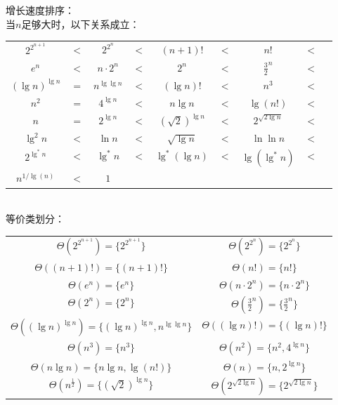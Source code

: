 
\begin{solution}
    增长速度排序：\\
    当$n$足够大时，以下关系成立：\\
    \begin{tabular}{ccccccccc}
        $2^{2^{n+1}}$       &$<$& $2^{2^n}$         &$<$& $(n+1)!$              &$<$& $n!$                  &$<$\\
        $e^n$               &$<$& $n \cdot 2^n$     &$<$& $2^n$                 &$<$& $\frac{3}{2}^{n}$     &$<$\\
        $(\lg n)^{\lg n}$   &$=$& $n^{\lg\lg n}$    &$<$& $(\lg n)!$            &$<$& $n^3$                 &$<$\\
        $n^2$               &$=$& $4^{\lg n}$       &$<$& $n\lg n$              &$<$& $\lg (n!)$            &$<$\\
        $n$                 &$=$& $2^{\lg n}$       &$<$& $(\sqrt{2})^{\lg n}$  &$<$& $2^{\sqrt{2\lg n}}$   &$<$\\
        $\lg^2 n$           &$<$& $\ln n$           &$<$& $\sqrt{\lg n}$        &$<$& $\ln\ln n$            &$<$\\
        $2^{\lg^* n}$       &$<$& $\lg^* n$         &$<$& $\lg^*(\lg n)$        &$<$& $\lg(\lg^* n)$        &$<$\\         
        $n^{1/\lg(n)}$      &$<$& $1$
    \end{tabular}\\
    等价类划分：\\
    \begin{longtable}{cc}
    $\Theta(2^{2^{n+1}}) = \{2^{2^{n+1}}\}$ &
    $\Theta(2^{2^n}) = \{2^{2^n}\}$\\
    $\Theta((n+1)!) = \{(n+1)!\}$&
    $\Theta(n!) = \{n!\}$\\
    $\Theta(e^n) = \{e^n\}$&
    $\Theta(n \cdot 2^n) = \{n \cdot 2^n\}$\\
    $\Theta(2^n) = \{2^n\}$&
    $\Theta(\frac{3}{2}^{n}) = \{\frac{3}{2}^{n}\}$\\
    $\Theta((\lg n)^{\lg n}) = \{(\lg n)^{\lg n}, n^{\lg\lg n}\}$&
    $\Theta((\lg n)!) = \{(\lg n)!\}$\\

    $\Theta(n^3) = \{n^3\}$&
    $\Theta(n^2) = \{n^2, 4^{\lg n}\}$\\
    $\Theta(n\lg n) = \{n\lg n, \lg (n!)\}$&
    $\Theta(n) = \{n, 2^{\lg n}\}$\\
    $\Theta(n^{\frac{1}{2}}) = \{(\sqrt{2})^{\lg n}\}$&
    $\Theta(2^{\sqrt{2\lg n}}) = \{2^{\sqrt{2\lg n}}\}$\\


\end{longtable}
\end{solution}

